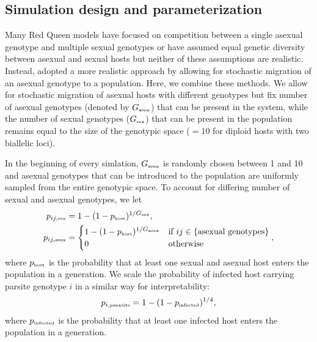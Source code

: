 \documentclass{article}\usepackage[]{graphicx}\usepackage[]{color}
\begin{document}
\subsection{Simulation design and parameterization}

Many Red Queen models have focused on competition between a single asexual genotype and multiple sexual genotypes or have assumed equal genetic diversity between asexual and sexual hosts \citep{ashby2015diversity} but neither of these assumptions are realistic.
Instead, \cite{ashby2015diversity} adopted a more realistic approach by allowing for stochastic migration of an asexual genotype to a population.
Here, we combine these methods.
We allow for stochastic migration of asexual hosts with different genotypes but fix number of asexual genotypes (denoted by $G_{\textrm{\tiny asex}}$) that can be present in the system, 
while the number of sexual genotypes ($G_{\textrm{\tiny sex}}$) that can be present in the population remains equal to the size of the genotypic space ($=10$ for diploid hosts with two biallelic loci).

In the beginning of every simlation, $G_{\textrm{\tiny asex}}$ is randomly chosen between 1 and 10 and asexual genotypes that can be introduced to the population are uniformly sampled from the entire genotypic space.
To account for differing number of sexual and asexual genotypes, we let 
\begin{equation}
\begin{aligned}
p_{ij, \textrm{\tiny sex}} &= 1-(1-p_{\textrm{\tiny host}})^{1/G_\textrm{\tiny sex}},\\
p_{ij, \textrm{\tiny asex}} &=
\begin{cases}
1-(1-p_{\textrm{\tiny host}})^{1/G_\textrm{\tiny asex}} & \text{if } ij \in \{\text{asexual genotypes}\} \\
0 & \text{otherwise}
\end{cases},
\end{aligned}
\end{equation}
where $p_{\textrm{\tiny host}}$ is the probability that at least one sexual and asexual host enters the population in a generation. We scale the probability of infected host carrying parsite genotype $i$ in a similar way for interpretability:
\begin{equation}
p_{i, \textrm{\tiny parasite}} = 1 - (1-p_{\textrm{\tiny infected}})^{1/4},
\end{equation}
where $p_{\textrm{\tiny infected}}$ is the probability that at least one infected host enters the population in a generation.
\end{document}
